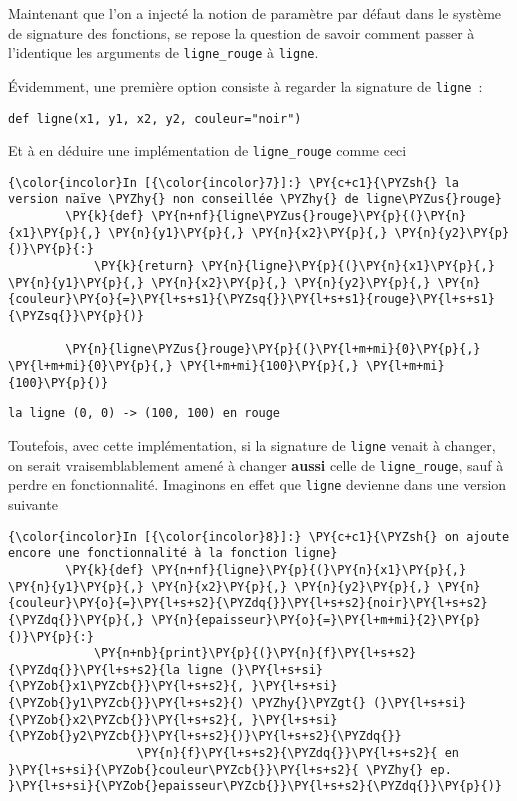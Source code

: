 Maintenant que l'on a injecté la notion de paramètre par défaut dans le
système de signature des fonctions, se repose la question de savoir
comment passer à l'identique les arguments de \texttt{ligne\_rouge} à
\texttt{ligne}.

    Évidemment, une première option consiste à regarder la signature de
\texttt{ligne}~:

\begin{verbatim}
def ligne(x1, y1, x2, y2, couleur="noir")
\end{verbatim}

    Et à en déduire une implémentation de \texttt{ligne\_rouge} comme ceci

    \begin{Verbatim}[commandchars=\\\{\}]
{\color{incolor}In [{\color{incolor}7}]:} \PY{c+c1}{\PYZsh{} la version naïve \PYZhy{} non conseillée \PYZhy{} de ligne\PYZus{}rouge}
        \PY{k}{def} \PY{n+nf}{ligne\PYZus{}rouge}\PY{p}{(}\PY{n}{x1}\PY{p}{,} \PY{n}{y1}\PY{p}{,} \PY{n}{x2}\PY{p}{,} \PY{n}{y2}\PY{p}{)}\PY{p}{:}
            \PY{k}{return} \PY{n}{ligne}\PY{p}{(}\PY{n}{x1}\PY{p}{,} \PY{n}{y1}\PY{p}{,} \PY{n}{x2}\PY{p}{,} \PY{n}{y2}\PY{p}{,} \PY{n}{couleur}\PY{o}{=}\PY{l+s+s1}{\PYZsq{}}\PY{l+s+s1}{rouge}\PY{l+s+s1}{\PYZsq{}}\PY{p}{)}
        
        \PY{n}{ligne\PYZus{}rouge}\PY{p}{(}\PY{l+m+mi}{0}\PY{p}{,} \PY{l+m+mi}{0}\PY{p}{,} \PY{l+m+mi}{100}\PY{p}{,} \PY{l+m+mi}{100}\PY{p}{)}
\end{Verbatim}


    \begin{Verbatim}[commandchars=\\\{\}]
la ligne (0, 0) -> (100, 100) en rouge

    \end{Verbatim}

    Toutefois, avec cette implémentation, si la signature de \texttt{ligne}
venait à changer, on serait vraisemblablement amené à changer
\textbf{aussi} celle de \texttt{ligne\_rouge}, sauf à perdre en
fonctionnalité. Imaginons en effet que \texttt{ligne} devienne dans une
version suivante

    \begin{Verbatim}[commandchars=\\\{\}]
{\color{incolor}In [{\color{incolor}8}]:} \PY{c+c1}{\PYZsh{} on ajoute encore une fonctionnalité à la fonction ligne}
        \PY{k}{def} \PY{n+nf}{ligne}\PY{p}{(}\PY{n}{x1}\PY{p}{,} \PY{n}{y1}\PY{p}{,} \PY{n}{x2}\PY{p}{,} \PY{n}{y2}\PY{p}{,} \PY{n}{couleur}\PY{o}{=}\PY{l+s+s2}{\PYZdq{}}\PY{l+s+s2}{noir}\PY{l+s+s2}{\PYZdq{}}\PY{p}{,} \PY{n}{epaisseur}\PY{o}{=}\PY{l+m+mi}{2}\PY{p}{)}\PY{p}{:}
            \PY{n+nb}{print}\PY{p}{(}\PY{n}{f}\PY{l+s+s2}{\PYZdq{}}\PY{l+s+s2}{la ligne (}\PY{l+s+si}{\PYZob{}x1\PYZcb{}}\PY{l+s+s2}{, }\PY{l+s+si}{\PYZob{}y1\PYZcb{}}\PY{l+s+s2}{) \PYZhy{}\PYZgt{} (}\PY{l+s+si}{\PYZob{}x2\PYZcb{}}\PY{l+s+s2}{, }\PY{l+s+si}{\PYZob{}y2\PYZcb{}}\PY{l+s+s2}{)}\PY{l+s+s2}{\PYZdq{}}
                  \PY{n}{f}\PY{l+s+s2}{\PYZdq{}}\PY{l+s+s2}{ en }\PY{l+s+si}{\PYZob{}couleur\PYZcb{}}\PY{l+s+s2}{ \PYZhy{} ep. }\PY{l+s+si}{\PYZob{}epaisseur\PYZcb{}}\PY{l+s+s2}{\PYZdq{}}\PY{p}{)}
\end{Verbatim}


